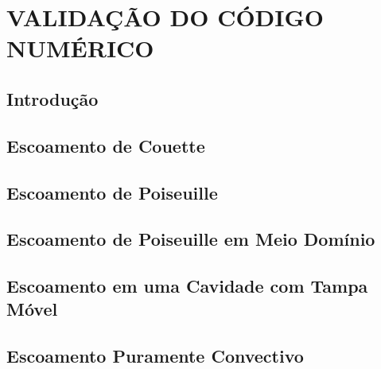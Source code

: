 \chapter{\textbf{VALIDAÇÃO DO CÓDIGO NUMÉRICO}}
\label{validacao}

\section{\textbf{Introdução}} 



\section{\textbf{Escoamento de Couette}} 
\label{couette}



\section{\textbf{Escoamento de Poiseuille}} 
\label{poiseuille}



\section{\textbf{Escoamento de Poiseuille em Meio Domínio}} 
\label{half poiseuille}



\section{\textbf{Escoamento em uma Cavidade com Tampa Móvel}} 
\label{cavity}



\section{\textbf{Escoamento Puramente Convectivo}} 
\label{convection}



